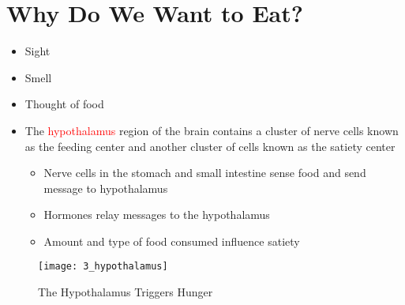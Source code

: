 \documentclass[title={Chapter 3}]{fdsn201notes}
\begin{document}
\section{Why Do We Want to Eat?}\label{sec:why-do-we-want-to-eat?}
\begin{itemize}
	\item Sight
	\item Smell
	\item Thought of food
\end{itemize}
\begin{itemize}
	\item The \textcolor{red}{hypothalamus} region of the brain contains a cluster of nerve cells known as the feeding center and another cluster of cells known as the satiety center
	\begin{itemize}
		\item Nerve cells in the stomach and small intestine sense food and send message to hypothalamus
		\item Hormones relay messages to the hypothalamus
		\item Amount and type of food consumed influence satiety
	\end{itemize}
\end{itemize}

\begin{figure}[H]
	\centering
	\texttt{[image: 3\_hypothalamus]}
	\caption{The Hypothalamus Triggers Hunger}
	\label{fig:hypothalamus-triggers-hunger}
\end{figure}
\end{document}
